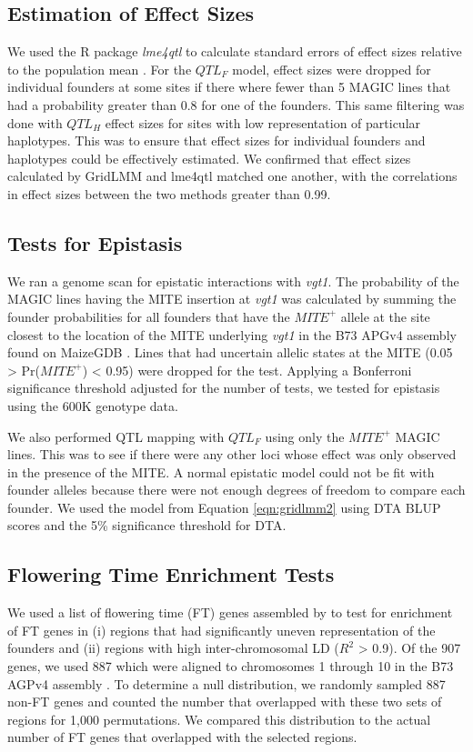 \documentclass[9pt,twocolumn,twoside]{gsag3jnl}
\begin{document}
\subsection{Estimation of Effect Sizes}
We used the R package \emph{lme4qtl} to calculate standard errors of effect sizes relative to the population mean \citep{Ziyatdinov}.
For the $QTL_F$ model, effect sizes were dropped for individual founders at some sites if there where fewer than 5 MAGIC lines that had a probability greater than 0.8 for one of the founders.
This same filtering was done with $QTL_H$ effect sizes for sites with low representation of particular haplotypes.
This was to ensure that effect sizes for individual founders and haplotypes could be effectively estimated.
We confirmed that effect sizes calculated by GridLMM and lme4qtl matched one another, with the correlations in effect sizes between the two methods greater than 0.99.

\subsection{Tests for Epistasis}
We ran a genome scan for epistatic interactions with \emph{vgt1}.
The probability of the MAGIC lines having the MITE insertion at \emph{vgt1} was calculated by summing the founder probabilities for all founders that have the $MITE^+$ allele at the site closest to the location of the MITE underlying \emph{vgt1} in the B73 APGv4 assembly found on MaizeGDB \citep{Portwood}.
Lines that had uncertain allelic states at the MITE (0.05 > Pr($MITE^+$) < 0.95) were dropped for the test.
Applying a Bonferroni significance threshold adjusted for the number of tests, we tested for epistasis using the 600K genotype data.

We also performed QTL mapping with $QTL_F$ using only the $MITE^+$ MAGIC lines.
This was to see if there were any other loci whose effect was only observed in the presence of the MITE.
A normal epistatic model could not be fit with founder alleles because there were not enough degrees of freedom to compare each founder.
We used the model from Equation \ref{eqn:gridlmm2} using DTA BLUP scores and the 5\% significance threshold for DTA.

\subsection{Flowering Time Enrichment Tests}
We used a list of flowering time (FT) genes assembled by \citep{Li5} to test for enrichment of FT genes in (i) regions that had significantly uneven representation of the founders and (ii) regions with high inter-chromosomal LD ($R^2$ > 0.9).
Of the 907 genes, we used 887 which were aligned to chromosomes 1 through 10 in the B73 AGPv4 assembly \citep{Jiao}.
To determine a null distribution, we randomly sampled 887 non-FT genes and counted the number that overlapped with these two sets of regions for 1,000 permutations.
We compared this distribution to the actual number of FT genes that overlapped with the selected regions.
\end{document}
